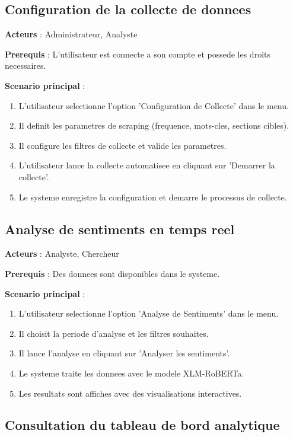 \subsection{Configuration de la collecte de donnees}

\textbf{Acteurs} : Administrateur, Analyste

\textbf{Prerequis} : L'utilisateur est connecte a son compte et possede les droits necessaires.

\textbf{Scenario principal} :
\begin{enumerate}
    \item L'utilisateur selectionne l'option 'Configuration de Collecte' dans le menu.
    \item Il definit les parametres de scraping (frequence, mots-cles, sections cibles).
    \item Il configure les filtres de collecte et valide les parametres.
    \item L'utilisateur lance la collecte automatisee en cliquant sur 'Demarrer la collecte'.
    \item Le systeme enregistre la configuration et demarre le processus de collecte.
\end{enumerate}

\subsection{Analyse de sentiments en temps reel}

\textbf{Acteurs} : Analyste, Chercheur

\textbf{Prerequis} : Des donnees sont disponibles dans le systeme.

\textbf{Scenario principal} :
\begin{enumerate}
    \item L'utilisateur selectionne l'option 'Analyse de Sentiments' dans le menu.
    \item Il choisit la periode d'analyse et les filtres souhaites.
    \item Il lance l'analyse en cliquant sur 'Analyser les sentiments'.
    \item Le systeme traite les donnees avec le modele XLM-RoBERTa.
    \item Les resultats sont affiches avec des visualisations interactives.
\end{enumerate}

\subsection{Consultation du tableau de bord analytique}


